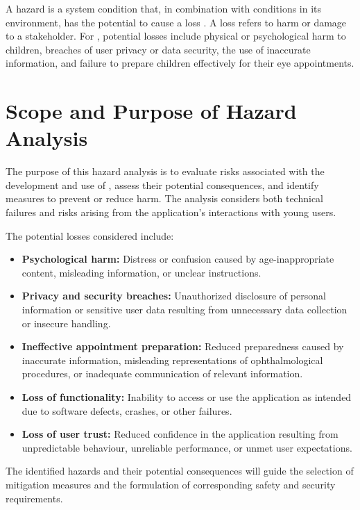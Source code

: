 \documentclass{article}
\newcounter{hazard}
\begin{document}
A hazard is a system condition that, in combination with conditions in its
environment, has the potential to cause a loss \cite{Leveson2011}. A loss
refers to harm or damage to a stakeholder. For \progname{}, potential losses
include physical or psychological harm to children, breaches of user privacy
or data security, the use of inaccurate information, and failure to prepare
children effectively for their eye appointments.

\section{Scope and Purpose of Hazard Analysis}
\label{sec_Scope}

The purpose of this hazard analysis is to evaluate risks associated with the
development and use of \progname{}, assess their potential consequences, and
identify measures to prevent or reduce harm. The analysis considers both
technical failures and risks arising from the application's interactions
with young users.

The potential losses considered include:

\begin{itemize}
    \item \textbf{Psychological harm:} Distress or confusion caused by
    age-inappropriate content, misleading information, or unclear instructions.

    \item \textbf{Privacy and security breaches:} Unauthorized disclosure
    of personal information or sensitive user data resulting from unnecessary
    data collection or insecure handling.

    \item \textbf{Ineffective appointment preparation:} Reduced preparedness
    caused by inaccurate information, misleading representations of ophthalmological
    procedures, or inadequate communication of relevant information.

    \item \textbf{Loss of functionality:} Inability to access or use the application
    as intended due to software defects, crashes, or other failures.

    \item \textbf{Loss of user trust:} Reduced confidence in the application
    resulting from unpredictable behaviour, unreliable performance, or unmet user
    expectations.
\end{itemize}

The identified hazards and their potential consequences will guide the selection of
mitigation measures and the formulation of corresponding safety and security requirements.
\end{document}
